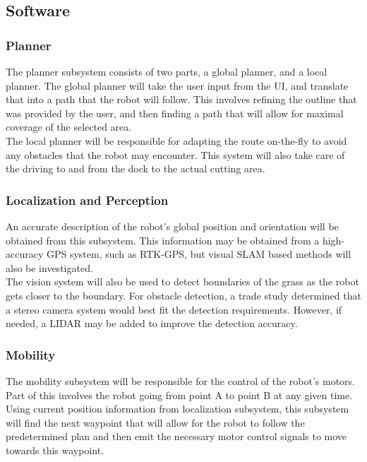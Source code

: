 \documentclass[12pt]{extarticle}
\begin{document}
	\subsection{Software}
		\subsubsection{Planner}
			The planner subsystem consists of two parts, a global planner, and  a local planner. The global planner will take the user input from the UI, and translate that into a path that the robot will follow. This involves refining the outline that was provided by the user, and then finding a path that will allow for maximal coverage of the selected area. \\ 
			
			The local planner will be responsible for adapting the route on-the-fly to avoid any obstacles that the robot may encounter. This system will also take care of the driving to and from the dock to the actual cutting area. 
			
		\subsubsection{Localization and Perception}
			An accurate description of the robot's global position and orientation will be obtained from this subsystem. This information may be obtained from a high-accuracy GPS system, such as RTK-GPS, but visual SLAM based methods will also be investigated. \\
			
			The vision system will also be used to detect boundaries of the grass as the robot gets closer to the boundary. For obstacle detection, a trade study determined that a stereo camera system would best fit the detection requirements. However, if needed, a LIDAR may be added to improve the detection accuracy. 
		
		\subsubsection{Mobility}
			The mobility subsystem will be responsible for the control of the robot's motors. Part of this involves the robot going from point A to point B at any given time. Using current position information from localization subsystem, this subsystem will find the next waypoint that will allow for the robot to follow the predetermined plan and then emit the necessary motor control signals to move towards this waypoint. \\
			
\end{document}
